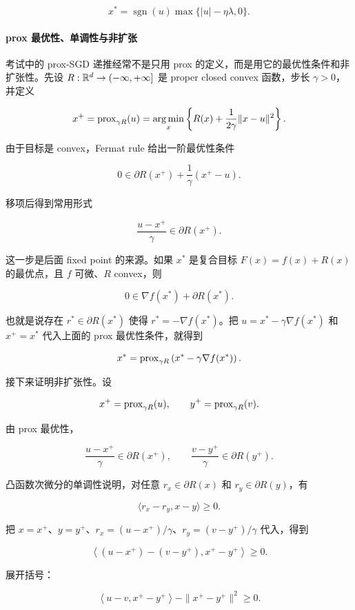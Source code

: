 \[
  x^*
  =
  \operatorname{sgn}(u)\max\{|u|-\eta\lambda,0\}.
\]

\paragraph{prox 最优性、单调性与非扩张}


考试中的 prox-SGD 递推经常不是只用 prox 的定义，而是用它的最优性条件和非扩张性。先设 \(R:\mathbb{R}^d\to(-\infty,+\infty]\) 是 proper closed convex 函数，步长 \(\gamma>0\)，并定义

\[
  x^+
  =
  \operatorname{prox}_{\gamma R}(u)
  =
  \operatorname*{arg\,min}_x
  \left\{
    R(x)+\frac{1}{2\gamma}\|x-u\|^2
  \right\}.
\]

由于目标是 convex，Fermat rule 给出一阶最优性条件

\[
  0
  \in
  \partial R(x^+)
  +
  \frac1\gamma(x^+-u).
\]

移项后得到常用形式

\[
  \frac{u-x^+}{\gamma}
  \in
  \partial R(x^+).
\]

这一步是后面 fixed point 的来源。如果 \(x^*\) 是复合目标 \(F(x)=f(x)+R(x)\) 的最优点，且 \(f\) 可微、\(R\) convex，则

\[
  0\in\nabla f(x^*)+\partial R(x^*).
\]

也就是说存在 \(r^*\in\partial R(x^*)\) 使得 \(r^*=-\nabla f(x^*)\)。把 \(u=x^*-\gamma\nabla f(x^*)\) 和 \(x^+=x^*\) 代入上面的 prox 最优性条件，就得到

\[
  x^*
  =
  \operatorname{prox}_{\gamma R}
  \left(x^*-\gamma\nabla f(x^*)\right).
\]

接下来证明非扩张性。设

\[
  x^+=\operatorname{prox}_{\gamma R}(u),
  \qquad
  y^+=\operatorname{prox}_{\gamma R}(v).
\]

由 prox 最优性，

\[
  \frac{u-x^+}{\gamma}\in\partial R(x^+),
  \qquad
  \frac{v-y^+}{\gamma}\in\partial R(y^+).
\]

凸函数次微分的单调性说明，对任意 \(r_x\in\partial R(x)\) 和 \(r_y\in\partial R(y)\)，有

\[
  \langle r_x-r_y,x-y\rangle\ge0.
\]

把 \(x=x^+\)、\(y=y^+\)、\(r_x=(u-x^+)/\gamma\)、\(r_y=(v-y^+)/\gamma\) 代入，得到

\[
  \left\langle
    (u-x^+)-(v-y^+),
    x^+-y^+
  \right\rangle
  \ge0.
\]

展开括号：

\[
  \left\langle
    u-v,
    x^+-y^+
  \right\rangle
  -
  \|x^+-y^+\|^2
  \ge0.
\]

